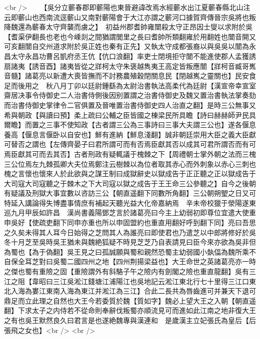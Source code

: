 <br />
　　【吳分立蘄春郡即蘄陽也東晉避諱改焉水經蘄水出江夏蘄春縣北山注云即蘄山也西南流逕蘄山又南對蘄陽會于大江亦謂之蘄河口據賀齊傳晉宗吳將也叛降魏還為蘄春太守齊襲而虜之】　初益州郡耆帥雍闓殺太守正昂因士燮以求附於吳【耆渠伊翻長也老也今嵊剡之間猶謂閭里之長曰耆帥所類翻雍於用翻姓也闓音開又可亥翻闓自交州道求附於吳正姓也秦有正先】又執太守成都張裔以與吳吳以闓為永昌太守永昌功曹呂凱府丞王伉【伉口浪翻】率吏士閉境拒守闓不能進使郡人孟獲誘扇諸夷【誘音酉】諸夷皆從之牂柯太守朱褒越雋夷王高定皆叛應闓【牂柯音臧哥嶲音髓】諸葛亮以新遭大喪皆撫而不討務農殖穀閉關息民【閉越嶲之靈關也】民安食足而後用之　秋八月丁卯以廷尉鍾繇為太尉治書執法高柔代為廷尉【漢宣帝幸宣室齋居决事令侍御史二人治書侍側後因别置謂之治書侍御史及魏又置治書執法掌奏劾而治書侍御史掌律令二官俱置及晉唯置治書侍御史四人治直之翻】是時三公無事又希與朝政【與讀曰預】柔上疏曰公輔之臣皆國之棟梁民所具瞻【詩曰赫赫師尹民具爾瞻】而置之三事不使知政【古者謂三公為三事詩曰三事大夫謂三公也】遂各偃息養高【偃息言偃卧以自安也】鮮有進納【鮮息淺翻】誠非朝廷崇用大臣之義大臣獻可替否之謂也【左傳齊晏子曰君所謂可而有否焉臣獻其否以成其可君所謂否而有可焉臣獻其可而去其否】古者刑政有疑輒議于槐棘之下【周禮朝士掌外朝之法而三槐三公位焉左九棘孤卿大夫位焉鄭注云樹棘以為位者取其赤心而外刺象以赤心三刺也槐之言懷也懷來人於此欲與之謀王制曰成獄辭史以獄成告于正正聽之正以獄成告于大司寇大司寇聽之于棘木之下大司寇以獄之成告于王王命三公參聽之】自今之後朝有疑議及刑獄大事宜數以咨訪三公【朝直遥翻下同數所角翻】三公朝朔朢之日又可特延入講論得失博盡事情庶有補起天聽光益大化帝嘉納焉　辛未帝校獵于滎陽遂東巡九月甲辰如許昌　漢尚書義陽鄧芝言於諸葛亮曰今主上幼弱初即尊位宜遣大使重申吳好【使疏吏翻下同申亦重也所以申固盟約也重直用翻好呼到翻下同】亮曰吾思之久矣未得其人耳今日始得之芝問其人為誰亮曰即使君也乃遣芝以中郎將修好於吳冬十月芝至吳時吳王猶未與魏絶狐疑不時見芝芝乃自表請見曰臣今來亦欲為吳非但為蜀也【為于偽翻】吳王見之曰孤誠願與蜀和親然恐蜀主幼弱國小埶偪為魏所乘不自保全耳芝對曰吳蜀二國四州之地【四州荆揚梁益也】大王命世之英諸葛亮亦一時之傑也蜀有重險之固【重險謂外有斜駱子午之險内有劍閣之險也重直龍翻】吳有三江之阻【韋昭曰三江吳淞江錢塘江浦陽江也吳地記云淞江東北行七十里得三江口東北入海為婁江東南入海為東江并淞江為三江】合此二長共為唇齒進可并兼天下退可鼎足而立此理之自然也大王今若委質於魏【質如字】魏必上望大王之入朝【朝直遥翻】下求太子之内侍若不從命則奉辭伐叛蜀亦順流見可而進如此江南之地非復大王之有也吳王默然良久曰君言是也遂絶魏專與漢連和　是歲漢主立妃張氏為皇后【后張飛之女也】<br />
<br />
